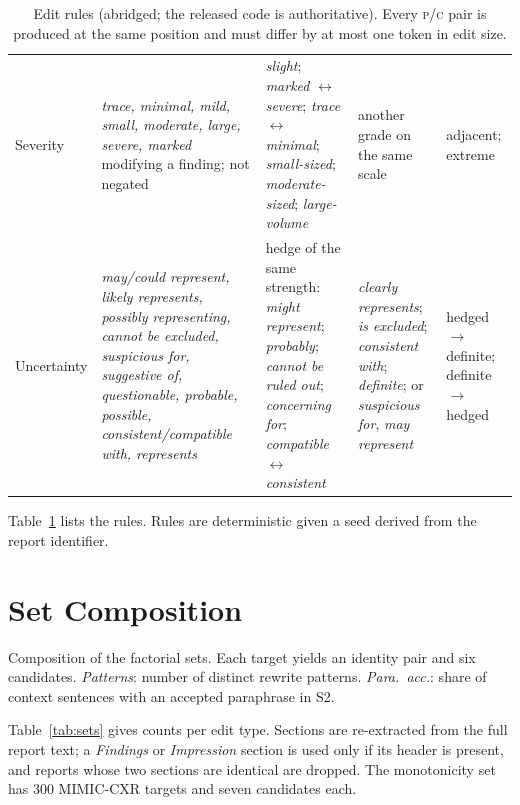 \documentclass[11pt]{article}
\newcommand{\Pc}{\textsc{p}\xspace}
\newcommand{\Cc}{\textsc{c}\xspace}
\begin{document}
\begin{table}[t]
\begin{tabular}{p{}p{}p{}p{}p{}}
Severity & \emph{trace, minimal, mild, small, moderate, large, severe, marked} modifying a finding; not negated & \emph{slight}; \emph{marked} $\leftrightarrow$ \emph{severe}; \emph{trace} $\leftrightarrow$ \emph{minimal}; \emph{small-sized}; \emph{moderate-sized}; \emph{large-volume} & another grade on the same scale & adjacent; extreme \\
Uncertainty & \emph{may/could represent, likely represents, possibly representing, cannot be excluded, suspicious for, suggestive of, questionable, probable, possible, consistent/compatible with, represents} & hedge of the same strength: \emph{might represent}; \emph{probably}; \emph{cannot be ruled out}; \emph{concerning for}; \emph{compatible} $\leftrightarrow$ \emph{consistent} & \emph{clearly represents}; \emph{is excluded}; \emph{consistent with}; \emph{definite}; or \emph{suspicious for}, \emph{may represent} & hedged$\to$definite; definite$\to$hedged \\
\bottomrule
\end{tabular}
\caption{Edit rules (abridged; the released code is authoritative). Every \Pc/\Cc pair is produced at the same position and must differ by at most one token in edit size.}
\label{tab:rules}
\end{table}

Table~\ref{tab:rules} lists the rules. Rules are deterministic given a seed derived from the report identifier.

\section{Set Composition}
\label{app:sets}

\begin{table}[t]
\centering
\small
\begin{adjustbox}{max width=\textwidth}

\end{adjustbox}
\caption{Composition of the factorial sets. Each target yields an identity pair and six candidates. \emph{Patterns}: number of distinct rewrite patterns. \emph{Para.\ acc.}: share of context sentences with an accepted paraphrase in S2.}
\label{tab:sets}
\end{table}

Table~\ref{tab:sets} gives counts per edit type. Sections are re-extracted from the full report text; a \emph{Findings} or \emph{Impression} section is used only if its header is present, and reports whose two sections are identical are dropped. The monotonicity set has 300 MIMIC-CXR targets and seven candidates each.
\end{document}

